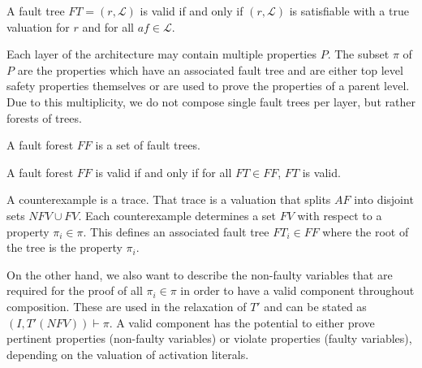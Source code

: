 \begin{definition} 
A fault tree $FT = (r, \mathcal{L})$ is valid if and only if $(r, \mathcal{L})$ is satisfiable with a true valuation for $r$ and for all $\mathit{af} \in \mathcal{L}$. 
\label{def:validFT}
\end{definition}


Each layer of the architecture may contain multiple properties $P$. The subset $\pi$ of $P$ are the properties which have an associated fault tree and are either top level safety properties themselves or are used to prove the properties of a parent level. Due to this multiplicity, we do not compose single fault trees per layer, but rather forests of trees.

\begin{definition}
A fault forest $\mathit{FF}$ is a set of fault trees.
\end{definition}

\begin{definition}
A fault forest $\mathit{FF}$ is valid if and only if for all $\mathit{FT} \in \mathit{FF}$, $\mathit{FT}$ is valid.
\label{def:validFF}
\end{definition}



A counterexample is a trace. That trace is a valuation that splits $\mathit{AF}$ into disjoint sets $\mathit{NFV} \cup \mathit{FV}$. Each counterexample determines a set $\mathit{FV}$ with respect to a property $\pi_i \in \pi$. This defines an associated fault tree $\mathit{FT}_i \in \mathit{FF}$ where the root of the tree is the property $\pi_i$.  

On the other hand, we also want to describe the non-faulty variables that are required for the proof of all $\pi_i \in \pi$ in order to have a valid component throughout composition. These are used in the relaxation of $T'$ and can be stated as $(I, T'(\mathit{NFV})) \vdash \pi$. A valid component has the potential to either prove pertinent properties (non-faulty variables) or violate properties (faulty variables), depending on the valuation of activation literals. 

